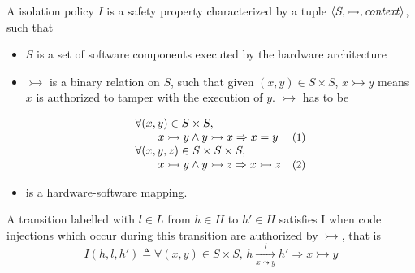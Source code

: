 \begin{definition}
  \label{def:speccert:global}
  A isolation policy $I$ is a safety property characterized by a tuple
  $\langle S, \rightarrowtail, \mathit{context} \rangle$, such that
  \begin{itemize}
  \item $S$ is a set of software components executed by the hardware
    architecture
  \item $\rightarrowtail$ is a binary relation on $S$, such that given
    $(x, y) \in S \times S$, $x \rightarrowtail y$ means $x$ is authorized to
    tamper with the execution of $y$. $\rightarrowtail$ has to be
    \[
      \begin{array}{lr}
        \forall (x, y) \in S \times S,
        & \\
        \qquad x \rightarrowtail y \wedge y
        \rightarrowtail x \Rightarrow x = y
        & \text{\small (1)} \\
        \forall (x, y, z) \in S \times S \times S,
        & \\
        \qquad x \rightarrowtail y \wedge y
        \rightarrowtail z \Rightarrow x \rightarrowtail z
        & \text{\small (2)}
      \end{array}
    \]
  \item {} is a hardware-software mapping.
  \end{itemize}

  A transition labelled with $l \in L$ from $h \in H$ to $h' \in H$ satisfies I
  when code injections which occur during this transition are authorized by
  $\rightarrowtail$, that is
  \[
    I(h, l, h') \triangleq \forall (x, y) \in S \times S \text{, } h
    \xrightarrow[x \leadsto y]{l} h' \Rightarrow x \rightarrowtail y
  \]
\end{definition}

%
%

